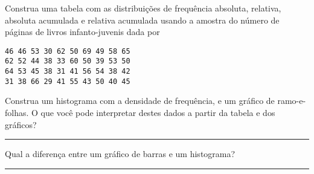 \documentclass[a4paper,11pt,fleqn]{article}\usepackage[]{graphicx}\usepackage[]{color}
\theoremstyle{definition}
\begin{document}
\begin{compactenum}[7.]
\item Construa uma tabela com as distribuições de frequência absoluta,
  relativa, absoluta acumulada e relativa acumulada usando a amostra do
  número de páginas de livros infanto-juvenis dada por
\begin{verbatim}
46 46 53 30 62 50 69 49 58 65
62 52 44 38 33 60 50 39 53 50
64 53 45 38 31 41 56 54 38 42
31 38 66 29 41 55 43 50 40 45
\end{verbatim}
  Construa um histograma com a densidade de frequência, e um gráfico de
  ramo-e-folhas. O que você pode interpretar destes dados a partir da
  tabela e dos gráficos?
\end{compactenum}

\vspace{0.3cm}
\hrule
\vspace{0.3cm}

\begin{compactenum}[8.]
\item Qual a diferença entre um gráfico de barras e um histograma?
\end{compactenum}

\vspace{0.3cm}
\hrule
\vspace{0.3cm}
\end{document}
